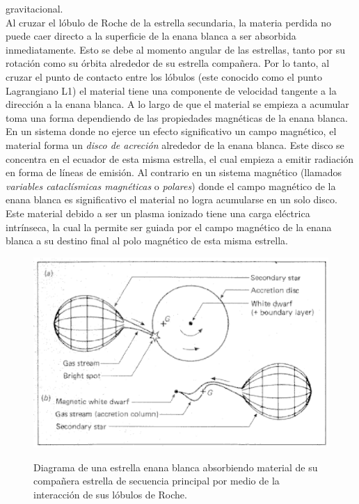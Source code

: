 {gravitacional. \\\newline
Al cruzar el lóbulo de Roche de la estrella secundaria, la materia perdida no
puede caer directo a la superficie de la enana blanca a ser absorbida
inmediatamente. Esto se debe al momento angular de las estrellas, tanto por su
rotación como su órbita alrededor de su estrella compañera. Por lo tanto, al
cruzar el punto de contacto entre los lóbulos (este conocido como el punto
Lagrangiano L1) el material tiene una componente de velocidad tangente a la
dirección a la enana blanca. A lo largo de que el material se empieza a acumular
toma una forma dependiendo de las propiedades magnéticas de la enana blanca. En
un sistema donde no ejerce un efecto significativo un campo magnético, el
material forma un \textit{disco de acreción} alrededor de la enana blanca. Este
disco se concentra en el ecuador de esta misma estrella, el cual empieza a
emitir radiación en forma de líneas de emisión. Al contrario en un sistema
magnético (llamados \textit{variables cataclísmicas magnéticas} o
\textit{polares}) donde el campo magnético de la enana blanca es significativo
el material no logra acumularse en un solo disco. Este material debido a ser un
plasma ionizado tiene una carga eléctrica intrínseca, la cual la permite ser
guiada por el campo magnético de la enana blanca a su destino final al polo
magnético de esta misma estrella. \\\newline
\begin{figure}
	\centering
	\includegraphics[scale=0.4]{Introduccion/Figures/Figura Acrecion_SmithReview.png}
	\caption{Diagrama de una estrella enana blanca absorbiendo material de su
		compañera estrella de secuencia principal por medio de la interacción de sus
		lóbulos de Roche.} \citet{smithReview}
	\label{acrecionSmithReview}
\end{figure}

}
